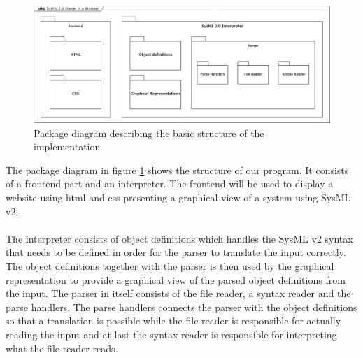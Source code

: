 \documentclass{article}
\begin{document}
\begin{figure}[H]
    \begin{center}
        \includegraphics[width=1\textwidth]{Packages_SysML-Project_first-draft.png}
        \caption{Package diagram describing the basic structure of the implementation}
        \label{package}
    \end{center}
\end{figure}

The package diagram in figure \ref{package} shows the structure of our program. It consists of a frontend part and an interpreter. The frontend will be used to display a website using html and css presenting a graphical view of a system using SysML v2. 
\\\\
The interpreter consists of object definitions which handles the SysML v2 syntax that needs to be defined in order for the parser to translate the input correctly. The object definitions together with the parser is then used by the graphical representation to provide a graphical view of the parsed object definitions from the input. The parser in itself consists of the file reader, a syntax reader and the parse handlers. The parse handlers connects the parser with the object definitions so that a translation is possible while the file reader is responsible for actually reading the input and at last the syntax reader is responsible for interpreting what the file reader reads.


\printbibliography
\end{document}
